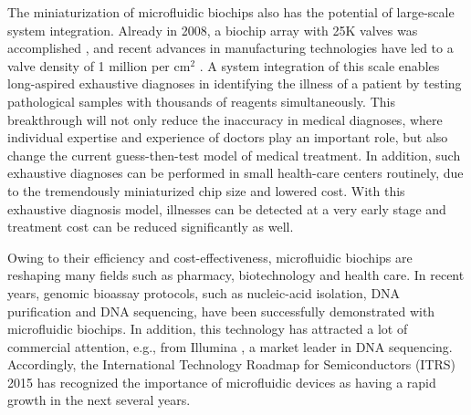 The miniaturization of microfluidic biochips also has the potential of
large-scale
system integration. Already in 2008, a biochip array with 25K valves was
accomplished \cite{JMPK08}, and recent advances in manufacturing technologies have 
led to
a valve density of 1 million per cm$^2$ %
\cite{C2LC40258K}. 
A system integration of this scale
enables long-aspired exhaustive diagnoses in identifying the illness 
of a patient by testing pathological samples with thousands of reagents 
simultaneously. This breakthrough will not only reduce
the inaccuracy in medical diagnoses, where individual expertise and experience
of doctors play an important role, but also change the current 
guess-then-test model of medical treatment. 
In addition, such exhaustive diagnoses can be performed in
small health-care centers routinely, 
due to the
tremendously miniaturized chip size and lowered cost. 
With this exhaustive diagnosis model, illnesses can be detected at a very early stage and 
treatment cost can be reduced significantly as well.

Owing to their efficiency and cost-effectiveness, microfluidic biochips are
reshaping many fields such as pharmacy, biotechnology and health care.
In recent years, genomic bioassay protocols, such as nucleic-acid
isolation, DNA purification and DNA sequencing, have been successfully
demonstrated with microfluidic biochips. In addition, this technology has 
attracted a lot of commercial attention, e.g., from Illumina \cite{illum}, 
a market leader in DNA sequencing. 
Accordingly, 
the International Technology Roadmap
for Semiconductors (ITRS) 2015 \cite{itrs}
has  
recognized the importance of microfluidic devices as 
having a rapid growth in the next several years. 



